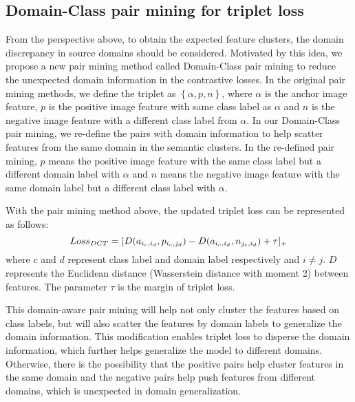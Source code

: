 \documentclass[a4paper,fleqn]{cas-dc}
\begin{document}
\subsection{Domain-Class pair mining for triplet loss}
From the perspective above, to obtain the expected feature clusters, the domain discrepancy in source domains should be considered. Motivated by this idea, we propose a new pair mining method called Domain-Class pair mining to reduce the unexpected domain information in the contrastive losses. In the original pair mining methods, we define the triplet as $\left\{\alpha,p,n\right\}$, where $\alpha$ is the anchor image feature, $p$ is the positive image feature with same class label as $\alpha$ and $n$ is the negative image feature with a different class label from $\alpha$. In our Domain-Class pair mining, we re-define the pairs with domain information to help scatter features from the same domain in the semantic clusters. In the re-defined pair mining, $p$ means the positive image feature with the same class label  but a different domain label with $\alpha$ and $n$ means the negative image feature with the same domain label but a different class label with $\alpha$. \par
With the pair mining method above, the updated triplet loss can be represented as follows:
\begin{equation}
\centering
Loss_{DCT} = [D(a_{i_{c},i_{d}},p_{i_{c},j_{d}})-D(a_{i_{c},i_{d}},n_{j_{c},i_{d}})+\tau]_{+}
\label{eq1}
\end{equation}
where $c$ and $d$ represent class label and domain label respectively and $i\neq j$. $D$ represents the Euclidean distance (Wasserstein distance with moment 2) between features. The parameter $\tau$ is the margin of triplet loss. \par
This domain-aware pair mining will help not only cluster the features based on class labels, but will also scatter the features by domain labels to generalize the domain information. This modification enables triplet loss to disperse the domain information, which further helps generalize the model to different domains.  Otherwise, there is the possibility that the positive pairs help cluster features in the same domain and the negative pairs help push features from different domains, which is unexpected in domain generalization.  
 
\end{document}
